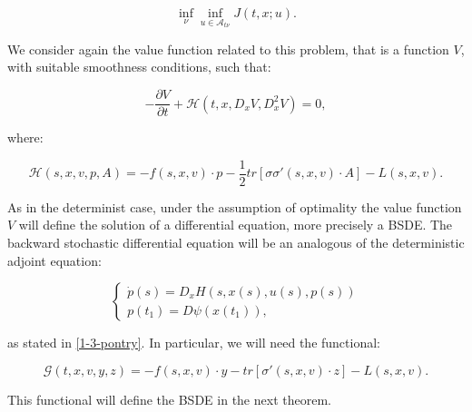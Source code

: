 \[\inf_{\nu}\inf_{u\in\mathcal{A}_{t\nu}} J(t,x;u).\]

We consider again the value function related to this problem, that is a function $V$, with suitable smoothness conditions, such that:

\begin{equation}
    -\frac{\partial V}{\partial t} + \mathcal{H}(t,x,D_xV,D_x^2V) = 0,
\end{equation}

where:

\begin{equation}
    \mathcal{H}(s,x,v,p,A) = - f(s,x,v)\cdot p - \frac{1}{2}tr\left[\sigma\sigma'(s,x,v)\cdot A\right] - L(s,x,v).
\end{equation}

As in the determinist case, under the assumption of optimality the value function $V$ will define the solution 
of a differential equation, more precisely a BSDE. The backward stochastic differential equation will be an 
analogous of the deterministic adjoint equation:

\[\begin{cases}
    \dot{p}(s) = D_xH(s,x(s),u(s),p(s)) \\
    p(t_1) = D\psi(x(t_1)),
\end{cases}\]

as stated in \ref{1-3-pontry}. In particular, we will need the functional:

\begin{equation}\label{3-2-defG}\mathcal{G}(t,x,v,y,z) = -f(s,x,v)\cdot y - tr\left[\sigma'(s,x,v)\cdot z\right] - L(s,x,v).\end{equation}

This functional will define the BSDE in the next theorem.

